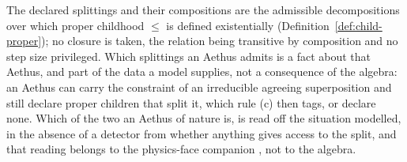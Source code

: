 \begin{defin}
\begin{enumerate}
\end{enumerate}
The declared splittings and their compositions are the admissible decompositions over which proper childhood $\le$ is defined existentially (Definition~\ref{def:child-proper}); no closure is taken, the relation being transitive by composition and no step size privileged. Which splittings an Aethus admits is a fact about that Aethus, and part of the data a model supplies, not a consequence of the algebra: an Aethus can carry the constraint of an irreducible agreeing superposition and still declare proper children that split it, which rule (c) then tags, or declare none. Which of the two an Aethus of nature is, is read off the situation modelled, in the absence of a detector from whether anything gives access to the split, and that reading belongs to the physics-face companion \cite{AethusQuant}, not to the algebra.
\end{defin}

